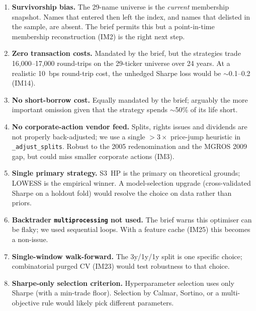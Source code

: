 \documentclass[11pt,a4paper]{article}
\begin{document}
\begin{enumerate}[leftmargin=1.5em,itemsep=4pt]
    \item \textbf{Survivorship bias.} The 29-name universe is the
          \emph{current} membership snapshot. Names that entered then left
          the index, and names that delisted in the sample, are absent. The
          brief permits this but a point-in-time membership reconstruction
          (IM2) is the right next step.

    \item \textbf{Zero transaction costs.} Mandated by the brief, but the
          strategies trade 16{,}000--17{,}000 round-trips on the
          29-ticker universe over 24 years. At a realistic
          10~bps round-trip cost, the unhedged Sharpe loss would be
          $\sim$0.1--0.2 (IM14).

    \item \textbf{No short-borrow cost.} Equally mandated by the brief;
          arguably the more important omission given that the strategy spends
          $\sim$50\% of its life short.

    \item \textbf{No corporate-action vendor feed.} Splits, rights issues
          and dividends are not properly back-adjusted; we use a single
          $>3\times$ price-jump heuristic in \texttt{\_adjust\_splits}.
          Robust to the 2005 redenomination and the MGROS 2009 gap, but
          could miss smaller corporate actions (IM3).

    \item \textbf{Single primary strategy.} S3~HP is the primary on
          theoretical grounds; LOWESS is the empirical winner. A
          model-selection upgrade (cross-validated Sharpe on a holdout fold)
          would resolve the choice on data rather than priors.

    \item \textbf{Backtrader \texttt{multiprocessing} not used.} The brief
          warns this optimiser can be flaky; we used sequential loops. With
          a feature cache (IM25) this becomes a non-issue.

    \item \textbf{Single-window walk-forward.} The 3y/1y/1y split is one
          specific choice; combinatorial purged CV (IM23) would test
          robustness to that choice.

    \item \textbf{Sharpe-only selection criterion.} Hyperparameter selection
          uses only Sharpe (with a min-trade floor). Selection by Calmar,
          Sortino, or a multi-objective rule would likely pick different
          parameters.
\end{enumerate}
\end{document}
